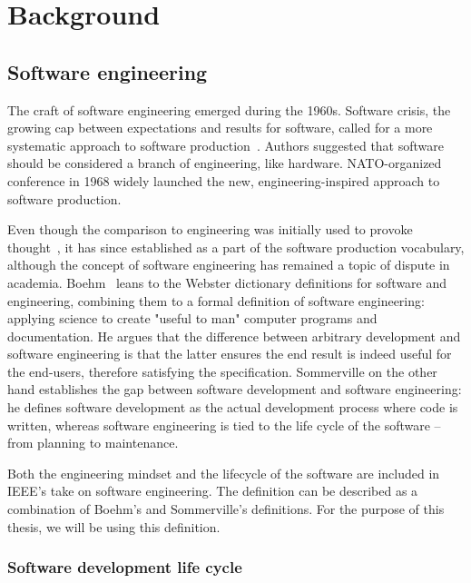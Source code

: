 \chapter{Background}

\section{Software engineering}

The craft of software engineering emerged during the 1960s. Software crisis, the growing cap between expectations and results for software, called for a more systematic approach to software production~\cite{mcclure_nato_1968}. Authors suggested that software should be considered a branch of engineering, like hardware. NATO-organized conference in 1968 widely launched the new, engineering-inspired approach to software production.

Even though the comparison to engineering was initially used to provoke thought~\cite{mcclure_nato_1968}, it has since established as a part of the software production vocabulary, although the concept of software engineering has remained a topic of dispute in academia. Boehm~\cite{boehm_software_1979} leans to the Webster dictionary definitions for software and engineering, combining them to a formal definition of software engineering: applying science to create "useful to man" computer programs and documentation. He argues that the difference between arbitrary development and software engineering is that the latter ensures the end result is indeed useful for the end-users, therefore satisfying the specification.  Sommerville on the other hand establishes the gap between software development and software engineering: he defines software development as the actual development process where code is written, whereas software engineering is tied to the life cycle of the software – from planning to maintenance.~\cite{sommerville_software_2016}

Both the engineering mindset and the lifecycle of the software are included in IEEE's take on software engineering. The definition can be described as a combination of Boehm's and Sommerville's definitions. For the purpose of this thesis, we will be using this definition.~\cite{noauthor_ieee_1990}

\subsection{Software development life cycle}

